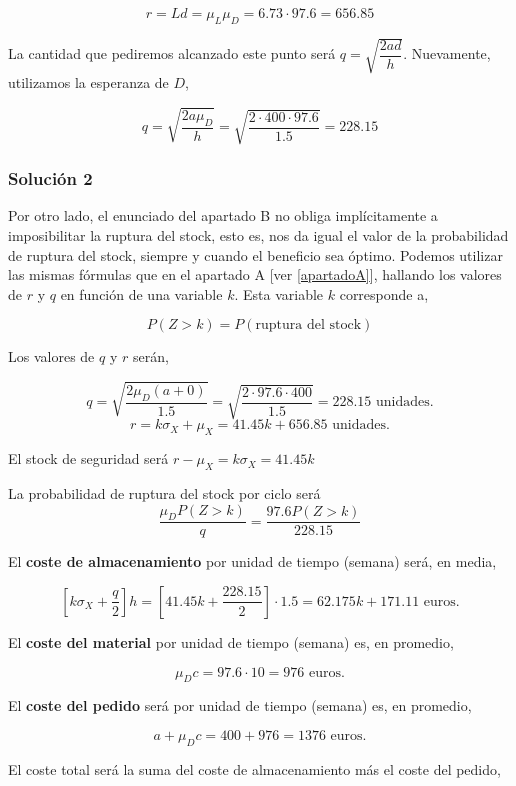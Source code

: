 \documentclass[a4paper,12pt]{article}
\begin{document}
$$ r = Ld = \mu_L \mu_D = 6.73 \cdot 97.6 = 656.85$$

La cantidad que pediremos alcanzado este punto ser\'a $q = \sqrt{\dfrac{2ad}{h}}$. Nuevamente, utilizamos la esperanza de $D$,

$$ q = \sqrt{\dfrac{2a\mu_D}{h}} = \sqrt{\dfrac{2\cdot 400\cdot 97.6}{1.5}} = 228.15$$

\subsubsection{Soluci\'on 2}
Por otro lado, el enunciado del apartado B no obliga impl\'icitamente a imposibilitar la ruptura del stock, esto es, nos da igual el valor de la probabilidad de ruptura del stock, siempre y cuando el beneficio sea \'optimo. Podemos utilizar las mismas f\'ormulas que en el apartado A [ver \ref{apartadoA}], hallando los valores de $r$ y $q$ en funci\'on de una variable $k$. Esta variable $k$ corresponde a,

$$ P(Z > k) = P(\text{ruptura del stock})$$

Los valores de $q$ y $r$ ser\'an,

$$ q = \sqrt{\dfrac{2\mu_D(a + 0)}{1.5}} = \sqrt{\dfrac{2\cdot 97.6\cdot 400}{1.5}} = 228.15 \text{ unidades.}$$
$$ r = k\sigma_X + \mu_X = 41.45k + 656.85 \text{ unidades.}$$

El stock de seguridad ser\'a $r - \mu_X = k\sigma_X = 41.45k$

La probabilidad de ruptura del stock por ciclo ser\'a $$ \dfrac{\mu_D P(Z > k)}{q} = \dfrac{97.6 P(Z > k)}{228.15}$$

El \textbf{coste de almacenamiento} por unidad de tiempo (semana) ser\'a, en media, 

$$ \left[k\sigma_X + \dfrac{q}{2}\right] h = \left[41.45k + \dfrac{228.15}{2} \right]\cdot 1.5 = 62.175k + 171.11 \text{ euros.}$$

El \textbf{coste del material} por unidad de tiempo (semana) es, en promedio,

$$ \mu_D c = 97.6\cdot 10 = 976 \text{ euros.}$$

El \textbf{coste del pedido} ser\'a por unidad de tiempo (semana) es, en promedio,

$$ a + \mu_D c = 400 + 976 = 1376 \text{ euros.}$$

El coste total ser\'a la suma del coste de almacenamiento m\'as el coste del pedido,
\end{document}
